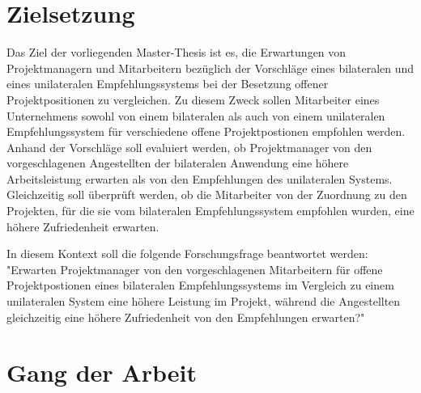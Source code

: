 \section{Zielsetzung}
\label{sec:intro:zielsetzung}
Das Ziel der vorliegenden Master-Thesis ist es, die Erwartungen von Projektmanagern und Mitarbeitern bezüglich der Vorschläge eines bilateralen und eines unilateralen Empfehlungssystems bei der Besetzung offener Projektpositionen zu vergleichen. Zu diesem Zweck sollen Mitarbeiter eines Unternehmens sowohl von einem bilateralen als auch von einem unilateralen Empfehlungssystem für verschiedene offene Projektpostionen empfohlen werden. Anhand der Vorschläge soll evaluiert werden, ob Projektmanager von den vorgeschlagenen Angestellten der bilateralen Anwendung eine höhere Arbeitsleistung erwarten als von den Empfehlungen des unilateralen Systems. Gleichzeitig soll überprüft werden, ob die Mitarbeiter von der Zuordnung zu den Projekten, für die sie vom bilateralen Empfehlungssystem empfohlen wurden, eine höhere Zufriedenheit erwarten.

In diesem Kontext soll die folgende Forschungsfrage beantwortet werden: "Erwarten Projektmanager von den vorgeschlagenen Mitarbeitern für offene Projektpostionen eines bilateralen Empfehlungssystems im Vergleich zu einem unilateralen System eine höhere Leistung im Projekt, während die Angestellten gleichzeitig eine höhere Zufriedenheit von den Empfehlungen erwarten?"

\section{Gang der Arbeit}
\label{sec:intro:gangDerArbeit}

